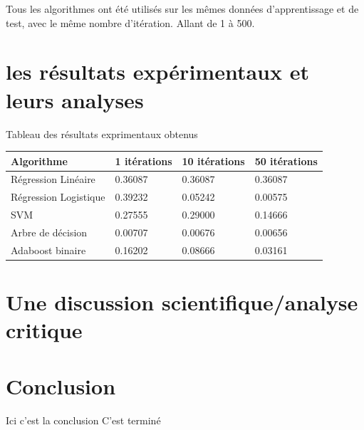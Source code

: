 \documentclass{article}
\begin{document}
Tous les algorithmes ont été utilisés sur les mêmes données d'apprentissage et de test, avec le même nombre d'itération. Allant de 1 à 500.





\section{les résultats expérimentaux et leurs analyses}
Tableau des résultats exprimentaux obtenus

\begin{center}
    \begin{tabular}{| l | l | l | l |}
    \hline
    Algorithme & 1 itérations & 10 itérations & 50 itérations \\ \hline
    Régression Linéaire & 0.36087 &  0.36087 &  0.36087 
    \\ \hline
    Régression Logistique & 0.39232 & 0.05242 & 0.00575  \\ \hline
    SVM & 0.27555 & 0.29000 & 0.14666  \\ \hline
    Arbre de décision & 0.00707 & 0.00676 & 0.00656 \\ \hline
    Adaboost binaire & 0.16202 & 0.08666 & 0.03161 \\
    \hline
    \end{tabular}
\end{center}


\section{Une discussion scientifique/analyse critique}

\section{Conclusion}
Ici c'est la conclusion 
C'est terminé



\end{document}
